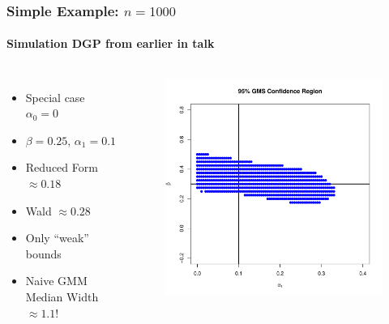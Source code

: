 \documentclass{beamer}
\begin{document}
\begin{frame}
  \frametitle{Simple Example: $n = 1000$}
  \framesubtitle{Simulation DGP from earlier in talk}
  \begin{columns}
    \footnotesize
    \begin{itemize}
      \item Special case $\alpha_0 = 0$
      \item $\beta = 0.25,\, \alpha_1 = 0.1$
      \item Reduced Form $\approx 0.18$
      \item Wald $\approx 0.28$
      \item Only ``weak'' bounds
      \item Naive GMM Median Width $\approx 1.1$!

    \end{itemize}
  \begin{figure}
    \centering
    \includegraphics[scale=0.35]{GMS.pdf}
  \end{figure}
  \end{columns}
\end{frame}
\end{document}
